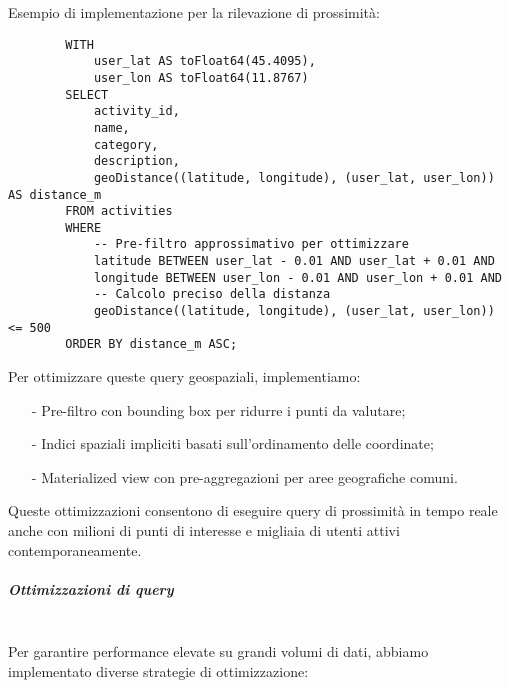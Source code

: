 \documentclass[10pt]{article}
\newcommand{\mysubparagraph}[1]{\subparagraph{#1}\mbox{}\\}
\begin{document}
        Esempio di implementazione per la rilevazione di prossimità:
        \begin{lstlisting}
        WITH 
            user_lat AS toFloat64(45.4095), 
            user_lon AS toFloat64(11.8767)
        SELECT 
            activity_id, 
            name,
            category,
            description,
            geoDistance((latitude, longitude), (user_lat, user_lon)) AS distance_m
        FROM activities
        WHERE 
            -- Pre-filtro approssimativo per ottimizzare
            latitude BETWEEN user_lat - 0.01 AND user_lat + 0.01 AND
            longitude BETWEEN user_lon - 0.01 AND user_lon + 0.01 AND
            -- Calcolo preciso della distanza
            geoDistance((latitude, longitude), (user_lat, user_lon)) <= 500
        ORDER BY distance_m ASC;
        \end{lstlisting}
        
        Per ottimizzare queste query geospaziali, implementiamo:
        \begin{itemize}
            \item[-] Pre-filtro con bounding box per ridurre i punti da valutare;
            \item[-] Indici spaziali impliciti basati sull'ordinamento delle coordinate;
            \item[-] Materialized view con pre-aggregazioni per aree geografiche comuni.
        \end{itemize}
        
        Queste ottimizzazioni consentono di eseguire query di prossimità in tempo reale anche con milioni di punti di interesse e migliaia di utenti attivi contemporaneamente.
        
        \mysubparagraph{Ottimizzazioni di query}
        Per garantire performance elevate su grandi volumi di dati, abbiamo implementato diverse strategie di ottimizzazione:
        
\end{document}
